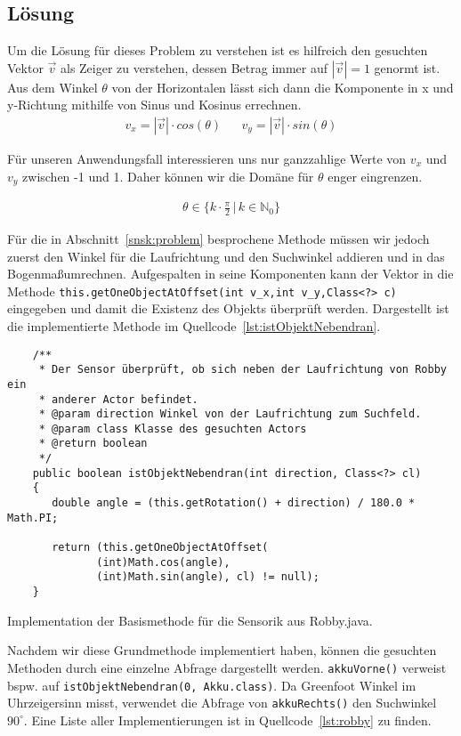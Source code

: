 \subsection{Lösung}
\label{snsk:loesung}
Um die Lösung für dieses Problem zu verstehen ist es hilfreich den gesuchten Vektor $ \vec{v} $ als Zeiger zu verstehen, dessen Betrag immer auf $ \left| \vec{v} \right| = 1 $ genormt ist. Aus dem Winkel $ \theta $ von der Horizontalen lässt sich dann die Komponente in x und y-Richtung mithilfe von Sinus und Kosinus errechnen.
\begin{align}
  v_x = \left| \vec{v} \right| \cdot cos (\theta) && v_y = \left| \vec{v} \right| \cdot sin (\theta)
\end{align}

Für unseren Anwendungsfall interessieren uns nur ganzzahlige Werte von $v_x$ und $v_y$ zwischen -1 und 1. Daher können wir die Domäne für $\theta$ enger eingrenzen.

\begin{align}
  \theta \in \Big\{ k \cdot \frac{\pi}{2} \, | \, k \in \mathbb{N}_0 \Big\}
\end{align}

Für die in Abschnitt~\ref{snsk:problem} besprochene Methode müssen wir jedoch zuerst den Winkel für die Laufrichtung und den Suchwinkel addieren und in das Bogenma\ss umrechnen. Aufgespalten in seine Komponenten kann der Vektor in die Methode \texttt{this.getOneObjectAtOffset(int v_x,int v_y,Class<?> c)} eingegeben und damit die Existenz des Objekts überprüft werden. Dargestellt ist die implementierte Methode im Quellcode~\ref{lst:istObjektNebendran}.
\begin{listing}
  \begin{verbatim}
    /**
     * Der Sensor überprüft, ob sich neben der Laufrichtung von Robby ein
     * anderer Actor befindet.
     * @param direction Winkel von der Laufrichtung zum Suchfeld.
     * @param class Klasse des gesuchten Actors
     * @return boolean
     */
    public boolean istObjektNebendran(int direction, Class<?> cl)
    {
       double angle = (this.getRotation() + direction) / 180.0 * Math.PI;

       return (this.getOneObjectAtOffset(
              (int)Math.cos(angle),
              (int)Math.sin(angle), cl) != null);
    }
  \end{verbatim}
  \caption{Implementation der Basismethode für die Sensorik aus Robby.java. }
  \label{lst:istObjektNebendran}
\end{listing}

Nachdem wir diese Grundmethode implementiert haben, können die gesuchten Methoden durch eine einzelne Abfrage dargestellt werden. \texttt{akkuVorne()} verweist bspw. auf  \texttt{istObjektNebendran(0, Akku.class)}. Da Greenfoot Winkel im Uhrzeigersinn misst, verwendet die Abfrage von \texttt{akkuRechts()} den Suchwinkel $90^\circ$. Eine Liste aller Implementierungen ist in Quellcode~\ref{lst:robby} zu finden.
